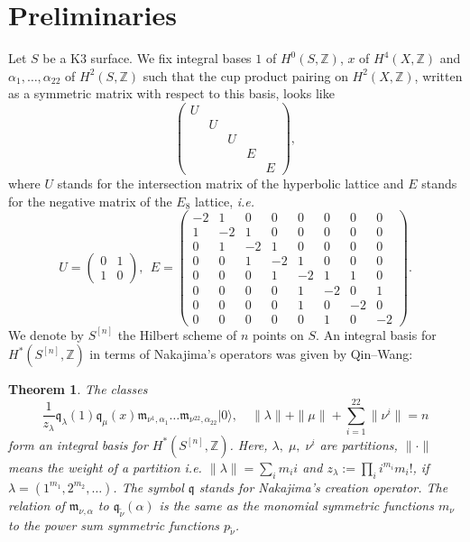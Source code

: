 \documentclass{amsart}
\newcommand{\hilb}[1]{^{[#1]}}
\newcommand{\ie}{{\it i.e. }}
\newcommand{\vac}{|0\rangle}
\newcommand{\coloneqq}{:=}
\newcommand{\IZ}{\mathbb{Z}}
\newcommand{\km}{\mathfrak{m}}
\newcommand{\kq}{\mathfrak{q}}
\theoremstyle{plain}
\newtheorem{theorem}{Theorem}[section]
\theoremstyle{definition}
\theoremstyle{remark}
\begin{document}
\section{Preliminaries}
Let $S$ be a K3 surface. We fix integral bases $1$ of $H^0(S,\IZ)$, $x$ of $H^4(X,\IZ)$ and $\alpha_1,\ldots ,\alpha_{22}$ of $H^2(S,\IZ)$ such that the cup product pairing on $H^2(X,\IZ)$, written as a symmetric matrix with respect to this basis, looks like
$$
\left(\begin{array}{ccccc}
U&&&& \\
&U&&& \\
&&U&& \\
&&&E& \\
&&&&E \end{array}\right),
$$
where $U$ stands for the intersection matrix of the hyperbolic lattice and $E$ stands for the negative matrix of the $E_8$ lattice, \ie 
\begin{equation*}
U = 
\left(\begin{array}{cc}
0&1\\1&0 \end{array}\right),
\ \ E = \left(\begin{array}{cccccccc}
-2&1&0&0&0&0&0&0\\1&-2&1&0&0&0&0&0\\0&1&-2&1&0&0&0&0\\0&0&1&-2&1&0&0&0\\0&0&0&1&-2&1&1&0\\0&0&0&0&1&-2&0&1\\0&0&0&0&1&0&-2&0\\0&0&0&0&0&1&0&-2
\end{array}\right).
\end{equation*}
We denote by $S\hilb{n}$ the Hilbert scheme of $n$ points on $S$. An integral basis for $H^\ast(S\hilb{n},\IZ)$ in terms of Nakajima's operators was given by Qin--Wang:
\begin{theorem} \cite[Thm. 5.4.]{QinWang} The classes
$$ \frac{1}{z_\lambda} \kq_\lambda(1)\kq_\mu(x)\km_{\nu^1,\alpha_1}\ldots\km_{\nu^{22},\alpha_{22}}\vac,\quad \|\lambda\| +\|\mu\| + \sum_{i=1}^{22}\|\nu^i\| = n
$$ 
form an integral basis for $H^\ast(S\hilb{n},\IZ)$. Here,
$\lambda,\; \mu,\; \nu^i$ are partitions, $\|\cdot\|$ means the weight of a partition \ie $\|\lambda\| = \sum_i m_i i$ and $z_\lambda \coloneqq\prod_i i^{m_i} m_i!$, if $\lambda = (1^{m_1},2^{m_2},\ldots)$. The symbol $\kq$ stands for Nakajima's creation operator. 
The relation of $\km_{\nu,\alpha}$ to $\kq_{\tilde{\nu}}(\alpha)$ is the same as the monomial symmetric functions
$m_\nu$ to the power sum symmetric functions 
$p_{\tilde{\nu}}$.
\end{theorem}
\end{document}
